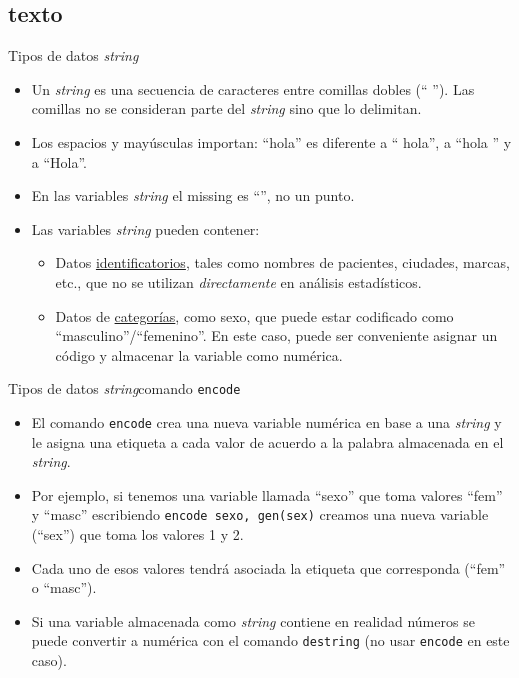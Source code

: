 \documentclass{beamer}
\begin{document}
\subsection{texto}

\begin{frame}{Tipos de datos \textit{string}}
\begin{itemize}
\item Un \textit{string} es una secuencia de caracteres entre comillas dobles (`` ''). Las comillas no se consideran parte del  \textit{string} sino que lo delimitan.
\item Los espacios y mayúsculas importan: ``hola'' es diferente a `` hola'', a ``hola '' y a ``Hola''.
\item En las variables \textit{string} el missing es ``'', no un punto.
\item Las variables \textit{string} pueden contener:
\begin{itemize}
\item Datos \underline{identificatorios}, tales como nombres de pacientes, ciudades, marcas, etc., que no se utilizan \textit{directamente} en análisis estadísticos.
\item Datos de \underline{categorías}, como sexo, que puede estar codificado como ``masculino''/``femenino''. En este caso, puede ser conveniente asignar un código y almacenar la variable como numérica. 
\end{itemize}
\end{itemize}
\end{frame}

\begin{frame}{Tipos de datos \textit{string}}{comando \texttt{encode}}
\begin{itemize}
\item El comando \texttt{encode} crea una nueva variable numérica en base a una \textit{string} y le asigna una etiqueta a cada valor de acuerdo a la palabra almacenada en el \textit{string}.
\item Por ejemplo, si tenemos una variable llamada ``sexo'' que toma valores ``fem'' y ``masc'' escribiendo \texttt{encode sexo, gen(sex)} creamos una nueva variable (``sex'') que toma los valores 1 y 2.
\item Cada uno de esos valores tendrá asociada la etiqueta que corresponda (``fem'' o ``masc'').
\item Si una variable almacenada como \textit{string} contiene en realidad números se puede convertir a numérica con el comando \texttt{destring} (no usar \texttt{encode} en este caso).
\end{itemize}
\end{frame}
\end{document}

